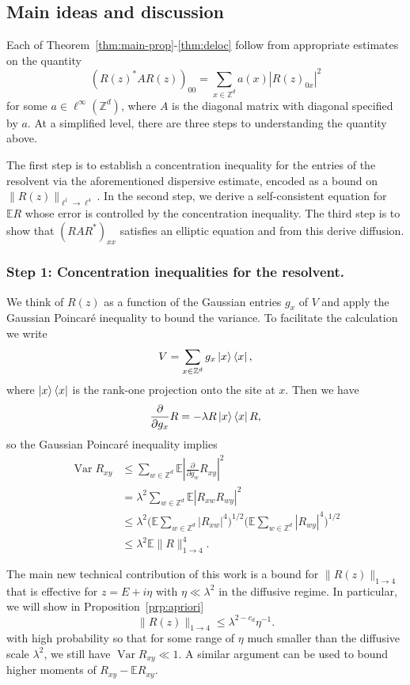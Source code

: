 \documentclass[11pt]{amsart}
\def\bbZ{{\mathbb Z}}
\def\Expec{{\mathbb E}}
\def\bra#1{\mathinner{\langle{#1}|}}
\def\ket#1{\mathinner{|{#1}\rangle}}
\numberwithin{equation}{section}
\numberwithin{theorem}{section}
\begin{document}
\subsection{Main ideas and discussion}
\label{sec:sketch}
Each of Theorem~\ref{thm:main-prop}-\ref{thm:deloc} follow from appropriate estimates on the quantity
\[
(R(z)^* A R(z))_{00} = \sum_{x\in\bbZ^d} a(x) |R(z)_{0x}|^2
\]
for some $a\in\ell^\infty(\bbZ^d)$, where $A$ is the diagonal matrix with diagonal specified by $a$.
At a simplified level, there are three steps to understanding the quantity above.

The first step is to establish a concentration inequality for the entries of the resolvent via the aforementioned dispersive estimate, encoded as a bound on $\|R(z)\|_{\ell^1\to\ell^4}$.
In the second step, we derive a self-consistent equation for $\Expec R$ whose error is controlled by the concentration inequality.
The third step is to show that $(RAR^*)_{xx}$ satisfies an elliptic equation and from this derive diffusion.
\subsubsection{Step 1: Concentration inequalities for the resolvent.}
\label{sec:conc-ineq}
We think of $R(z)$ as a function of the Gaussian entries $g_x$ of $V$ and apply the Gaussian Poincar{\'e} inequality to bound the variance.
To facilitate the calculation we write
\[
V = \sum_{x\in\bbZ^d} g_x \ket{x}\bra{x},
\]
where $\ket{x}\bra{x}$ is the rank-one projection onto the site at $x$.  Then we have
\begin{equation}
\label{eq:resolvent-derivative}
\frac{\partial}{\partial g_x}R=-\lambda R\ket{x}\bra{x}R,
\end{equation}
so the Gaussian Poincar{\'e} inequality implies
\begin{align*}
\operatorname*{Var} R_{xy}
&\leq \sum_{w\in\bbZ^d} \Expec |\frac{\partial}{\partial g_w} R_{xy}|^2 \\
&= \lambda^2 \sum_{w\in\bbZ^d} \Expec |R_{xw}R_{wy}|^2 \\
&\leq \lambda^2
\Big(\Expec \sum_{w\in\bbZ^d} |R_{xw}|^4\Big)^{1/2}
\Big(\Expec \sum_{w\in\bbZ^d} |R_{wy}|^4\Big)^{1/2} \\
&\leq \lambda^2 \Expec \|R\|_{1\to 4}^4.
\end{align*}

The main new technical contribution of this work is a bound for $\|R(z)\|_{1\to 4}$ that is effective for $z=E+i\eta$ with $\eta \ll \lambda^2$ in the
diffusive regime. In particular, we will show in  Proposition~\ref{prp:apriori}
\begin{equation}
\label{eq:simplified-onefour}
\|R(z)\|_{1\to 4} \leq  \lambda^{2-c_d} \eta^{-1}.
\end{equation}
with high probability so that for some range of $\eta$ much smaller than the diffusive scale $\lambda^2$, we still have $\operatorname*{Var} R_{xy} \ll 1$.  A similar argument can be used to bound higher moments of $R_{xy}-\Expec R_{xy}$.
\end{document}
